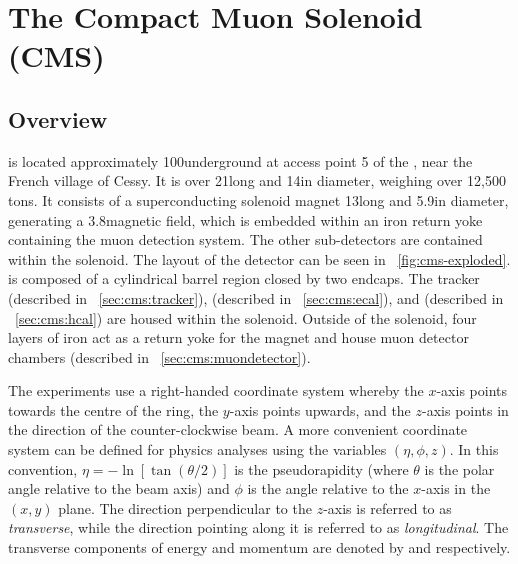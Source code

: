 \section{The Compact Muon Solenoid (CMS)}
\label{sec:cms}

\subsection{Overview}
\label{sec:cms:overview}

\CMS is located approximately 100\m underground at access point 5 of the \LHC, near the French village of Cessy. It is over 21\m long and 14\m in diameter, weighing over 12,500 tons. It consists of a superconducting solenoid magnet 13\m long and 5.9\m in diameter, generating a 3.8\T magnetic field, which is embedded within an iron return yoke containing the muon detection system. The other sub-detectors are contained within the solenoid. The layout of the \CMS detector can be seen in \Fig~\ref{fig:cms-exploded}. \CMS is composed of a cylindrical barrel region closed by two endcaps. The tracker (described in \Sec~\ref{sec:cms:tracker}), \ECAL (described in \Sec~\ref{sec:cms:ecal}), and \HCAL (described in \Sec~\ref{sec:cms:hcal}) are housed within the solenoid. Outside of the solenoid, four layers of iron act as a return yoke for the magnet and house muon detector chambers (described in \Sec~\ref{sec:cms:muondetector}). 

The \LHC experiments use a right-handed coordinate system whereby the $x$-axis points towards the centre of the \LHC ring, the $y$-axis points upwards, and the $z$-axis points in the direction of the counter-clockwise beam. A more convenient coordinate system can be defined for physics analyses using the variables $(\eta,\phi,z)$. In this convention, $\eta = -\ln [ \tan(\theta/2)]$ is the pseudorapidity (where $\theta$ is the polar angle relative to the beam axis) and $\phi$ is the angle relative to the $x$-axis in the $(x,y)$ plane. The direction perpendicular to the $z$-axis is referred to as \emph{transverse}, while the direction pointing along it is referred to as \emph{longitudinal}. The transverse components of energy and momentum are denoted by \ET and \pT respectively. 


